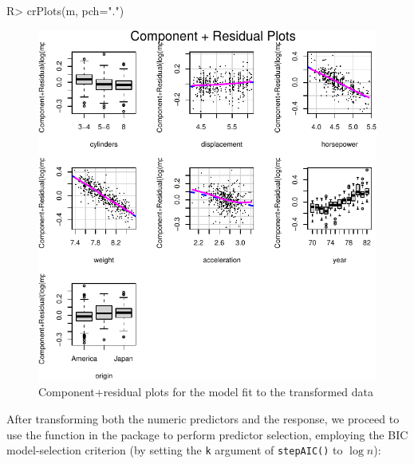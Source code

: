 \documentclass[
]{jss}
\begin{document}
\begin{CodeChunk}
\begin{CodeInput}
R> crPlots(m, pch=".")
\end{CodeInput}
\begin{figure}

{\centering \includegraphics[width=0.6\linewidth]{JSS-article-3_files/figure-latex/Auto-CR-plots-transformed-1} 

}

\caption[Component+residual plots for the model fit to the transformed  data]{Component+residual plots for the model fit to the transformed  data}\label{fig:Auto-CR-plots-transformed}
\end{figure}
\end{CodeChunk}

After transforming both the numeric predictors and the response, we
proceed to use the  function in the  package
to perform predictor selection, employing the BIC model-selection
criterion (by setting the \texttt{k} argument of \texttt{stepAIC()} to
\(\log n\)):
\end{document}
